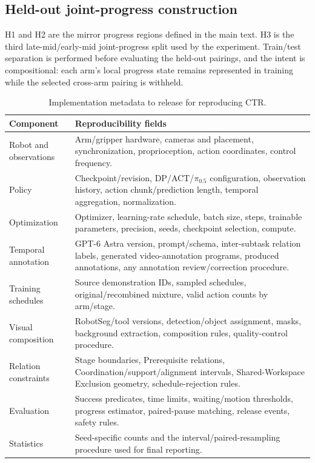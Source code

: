 \subsection{Held-out joint-progress construction}
H1 and H2 are the mirror progress regions defined in the main text. H3 is the third late-mid/early-mid joint-progress split used by the experiment. Train/test separation is performed before evaluating the held-out pairings, and the intent is compositional: each arm's local progress state remains represented in training while the selected cross-arm pairing is withheld.

\begin{table}[ht]
\caption{Implementation metadata to release for reproducing CTR.}
\label{tab:openconfig}
\centering\small
\begin{tabularx}{\linewidth}{lX}
\toprule
Component & Reproducibility fields \\
\midrule
Robot and observations & Arm/gripper hardware, cameras and placement, synchronization, proprioception, action coordinates, control frequency.\\
Policy & Checkpoint/revision, DP/ACT/$\pi_{0.5}$ configuration, observation history, action chunk/prediction length, temporal aggregation, normalization.\\
Optimization & Optimizer, learning-rate schedule, batch size, steps, trainable parameters, precision, seeds, checkpoint selection, compute.\\
Temporal annotation & GPT-6 Astra version, prompt/schema, inter-subtask relation labels, generated video-annotation programs, produced annotations, any annotation review/correction procedure.\\
Training schedules & Source demonstration IDs, sampled schedules, original/recombined mixture, valid action counts by arm/stage.\\
Visual composition & RobotSeg/tool versions, detection/object assignment, masks, background extraction, composition rules, quality-control procedure.\\
Relation constraints & Stage boundaries, Prerequisite relations, Coordination/support/alignment intervals, Shared-Workspace Exclusion geometry, schedule-rejection rules.\\
Evaluation & Success predicates, time limits, waiting/motion thresholds, progress estimator, paired-pause matching, release events, safety rules.\\
Statistics & Seed-specific counts and the interval/paired-resampling procedure used for final reporting.\\
\bottomrule
\end{tabularx}
\end{table}

